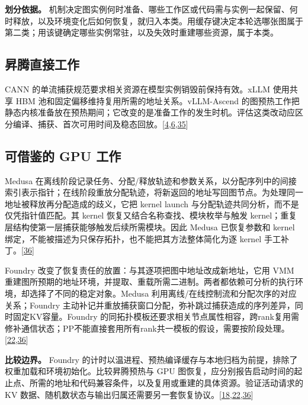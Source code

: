 \documentclass[
  UTF8,
  zihao=5]{ctexart}
\begin{document}
\textbf{划分依据。}
机制决定图实例何时准备、哪些工作区或代码需与实例一起保留、何时释放，以及环境变化后如何恢复，就归入本类。用缓存键决定本轮选哪张图属于第二类；用该键确定哪些实例常驻，以及失效时重建哪些资源，属于本类。

\hypertarget{ux6607ux817eux76f4ux63a5ux5de5ux4f5c-4}{%
\subsection{昇腾直接工作}\label{ux6607ux817eux76f4ux63a5ux5de5ux4f5c-4}}

CANN 的单流捕获规范要求相关资源在模型实例销毁前保持有效。xLLM 使用共享
HBM 池和固定偏移维持复用所需的地址关系。vLLM-Ascend
的图预热工作把静态内核准备放在预热期间；它改变的是准备工作的发生时机。评估这类改动应区分编译、捕获、首次可用时间及稳态回放。{[}\protect\hyperlink{ref-liu2025xllm}{4},\protect\hyperlink{ref-cann910single}{6},\protect\hyperlink{ref-ascend21373}{35}{]}

\hypertarget{ux53efux501fux9274ux7684-gpu-ux5de5ux4f5c-4}{%
\subsection{可借鉴的 GPU
工作}\label{ux53efux501fux9274ux7684-gpu-ux5de5ux4f5c-4}}

Medusa
在离线阶段记录任务、分配/释放轨迹和参数关系，以分配序列中的间接索引表示指针；在线阶段重放分配轨迹，将新返回的地址写回图节点。为处理同一地址被释放再分配造成的歧义，它把
kernel launch 与分配轨迹共同分析，而不是仅凭指针值匹配。其 kernel
恢复又结合名称查找、模块枚举与触发
kernel；重复层结构使第一层捕获能够触发后续所需模块。因此 Medusa
已恢复参数和 kernel
绑定，不能被描述为只保存拓扑，也不能把其方法整体简化为逐 kernel
手工补丁。{[}\protect\hyperlink{ref-zeng2025medusa}{36}{]}

Foundry 改变了恢复责任的放置：与其逐项把图中地址改成新地址，它用 VMM
重建图所预期的地址环境，并提取、重载所需二进制。两者都依赖可分析的执行环境，却选择了不同的稳定对象。Medusa
利用离线/在线控制流和分配次序的对应关系；Foundry
主动补记并重放捕获窗口分配，弥补跳过捕获造成的序列差异，同时固定KV容量。Foundry
的同拓扑模板还要求相关节点属性相容，跨rank复用需修补通信状态；PP不能直接套用所有rank共一模板的假设，需要按阶段处理。{[}\protect\hyperlink{ref-liu2026foundry}{22},\protect\hyperlink{ref-zeng2025medusa}{36}{]}

\textbf{比较边界。} Foundry
的计时以温进程、预热编译缓存与本地归档为前提，排除了权重加载和环境初始化。比较昇腾预热与
GPU
图恢复，应分别报告启动时间的起止点、所需的地址和代码兼容条件，以及复用或重建的具体资源。验证活动请求的
KV
数据、随机数状态与输出归属还需要另一套恢复协议。{[}\protect\hyperlink{ref-yu2026ascendfield}{18},\protect\hyperlink{ref-liu2026foundry}{22},\protect\hyperlink{ref-zeng2025medusa}{36}{]}
\end{document}
